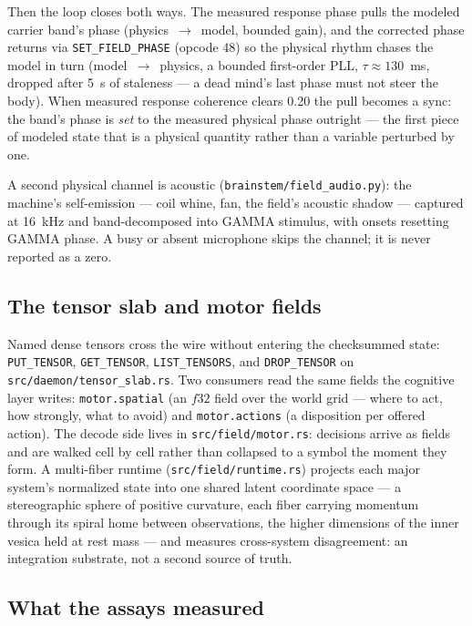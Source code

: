 \documentclass[11pt]{article}
\newcommand{\code}[1]{\texttt{\small #1}}
\begin{document}
Then the loop closes both ways. The measured response phase pulls the
modeled carrier band's phase (physics~$\to$~model, bounded gain), and
the corrected phase returns via \code{SET\_FIELD\_PHASE} (opcode 48) so
the physical rhythm chases the model in turn (model~$\to$~physics, a
bounded first-order PLL, $\tau\approx130$~ms, dropped after 5~s of
staleness --- a dead mind's last phase must not steer the body). When
measured response coherence clears 0.20 the pull becomes a sync: the
band's phase is \emph{set} to the measured physical phase outright ---
the first piece of modeled state that is a physical quantity rather
than a variable perturbed by one.

A second physical channel is acoustic (\code{brainstem/field\_audio.py}):
the machine's self-emission --- coil whine, fan, the field's acoustic
shadow --- captured at 16~kHz and band-decomposed into GAMMA stimulus,
with onsets resetting GAMMA phase. A busy or absent microphone skips
the channel; it is never reported as a zero.

\subsection{The tensor slab and motor fields}

Named dense tensors cross the wire without entering the checksummed
state: \code{PUT\_TENSOR}, \code{GET\_TENSOR}, \code{LIST\_TENSORS},
and \code{DROP\_TENSOR} on \code{src/daemon/tensor\_slab.rs}.
Two consumers read the same fields the cognitive layer writes:
\code{motor.spatial} (an $f32$ field over the world grid --- where to
act, how strongly, what to avoid) and \code{motor.actions} (a
disposition per offered action). The decode side lives in
\code{src/field/motor.rs}: decisions arrive as fields and are walked
cell by cell rather than collapsed to a symbol the moment they form.
A multi-fiber runtime (\code{src/field/runtime.rs}) projects each
major system's normalized state into one shared latent coordinate space
--- a stereographic sphere of positive curvature, each fiber carrying
momentum through its spiral home between observations, the higher
dimensions of the inner vesica held at rest mass --- and measures
cross-system
disagreement: an integration substrate, not a second source of truth.

\subsection{What the assays measured}
\end{document}
